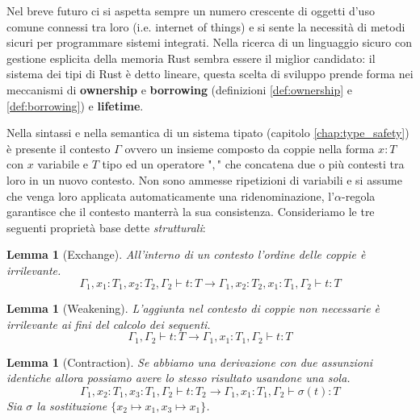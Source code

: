 \documentclass[Lau,binding=0.6cm]{sapthesis}
\newtheorem{lemma}[theorem]{Lemma}
\begin{document}
Nel breve futuro ci si aspetta sempre un numero crescente di oggetti d'uso comune connessi tra loro (i.e. internet of things) e si sente la necessità di metodi sicuri per programmare sistemi integrati. Nella ricerca di un linguaggio sicuro con gestione esplicita della memoria Rust sembra essere il miglior candidato: il sistema dei tipi di Rust è detto lineare, questa scelta di sviluppo prende forma nei meccanismi di \textbf{ownership} e \textbf{borrowing} (definizioni \ref{def:ownership} e \ref{def:borrowing}) e \textbf{lifetime}. 

Nella sintassi e nella semantica di un sistema tipato (capitolo \ref{chap:type_safety}) è presente il contesto $\Gamma$ ovvero un insieme composto da coppie nella forma $x:T$ con $x$ variabile e $T$ tipo ed un operatore "$,$" che concatena due o più contesti tra loro in un nuovo contesto. Non sono ammesse ripetizioni di variabili e si assume che venga loro applicata automaticamente una ridenominazione, l'$\alpha$-regola garantisce che il contesto manterrà la sua consistenza. Consideriamo le tre seguenti proprietà base dette \textit{strutturali}:

\begin{lemma}[Exchange] \label{lemma:exchange}
  All'interno di un contesto l'ordine delle coppie è irrilevante.
  \begin{equation*}
      \Gamma_{1},x_{1}:T_{1},x_{2}:T_{2},\Gamma_{2} \vdash t:T \longrightarrow \Gamma_{1},x_{2}:T_{2},x_{1}:T_{1},\Gamma_{2} \vdash t:T
  \end{equation*}
\end{lemma}

\begin{lemma}[Weakening] \label{lemma:weakening}
  L'aggiunta nel contesto di coppie non necessarie è irrilevante ai fini del calcolo dei sequenti.
  \begin{equation*}
      \Gamma_{1},\Gamma_{2} \vdash t:T \longrightarrow \Gamma_{1},x_{1}:T_{1},\Gamma_{2} \vdash t:T
  \end{equation*}
\end{lemma}

\begin{lemma}[Contraction] \label{lemma:contraction}
  Se abbiamo una derivazione con due assunzioni identiche allora possiamo avere lo stesso risultato usandone una sola.
  \begin{equation*}
      \Gamma_{1},x_{2}:T_{1},x_{3}:T_{1},\Gamma_{2} \vdash t:T_{2} \longrightarrow \Gamma_{1},x_{1}:T_{1},\Gamma_{2} \vdash \sigma(t):T
  \end{equation*}
  Sia $\sigma$ la sostituzione $\{ x_{2} \mapsto x_{1}, x_{3} \mapsto x_{1} \}$.
\end{lemma}
\end{document}
